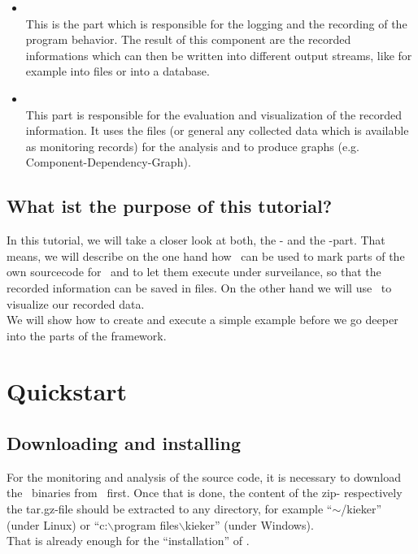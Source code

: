 \documentclass[a4paper, oneside, 11pt]{scrartcl}
\begin{document}
\begin{itemize}
\item \textbf{\KiekerMonitoring}\\
This is the part which is responsible for the logging and the recording of the program behavior. The result of this component are the recorded informations which can then be written into different output streams, like for example into files or into a database.
\item \textbf{\KiekerAnalysis}\\
This part is responsible for the evaluation and visualization of the recorded information. It uses the files (or general any collected data which is available as monitoring records) for the analysis and to produce graphs (e.g. Component-Dependency-Graph).
\end{itemize}

\subsection{What ist the purpose of this tutorial?}
In this tutorial, we will take a closer look at both, the \textbf{\KiekerMonitoring}- and the \textbf{\KiekerAnalysis}-part. That means, we will describe on the one hand how \KiekerMonitoring\ can be used to mark parts of the own sourcecode for \Kieker\ and to let them execute under surveilance, so that the recorded information can be saved in files. On the other hand we will use \KiekerAnalysis\ to visualize our recorded data.\\
We will show how to create and execute a simple example before we go deeper into the parts of the framework.

\section{Quickstart}
\subsection{Downloading and installing \Kieker}
For the monitoring and analysis of the source code, it is necessary to download the \Kieker\ binaries from \KiekerDownloadUrl\ first. Once that is done, the content of the zip- respectively the tar.gz-file should be extracted to any directory, for example ``$\sim$/kieker'' (under Linux) or ``c:$\backslash$program files$\backslash$kieker'' (under Windows).\\
That is already enough for the ``installation'' of \Kieker.
\end{document}
